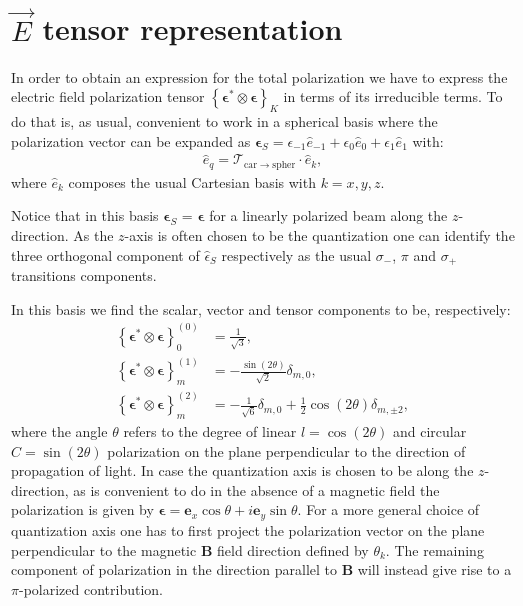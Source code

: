 \section{$\vec{E}$ tensor representation}
\label{app:E_field_tens}
In order to obtain an expression for the total polarization we have to express the electric field polarization tensor $\left\{\boldsymbol{\epsilon}^* \otimes \boldsymbol{\epsilon}\right\}_K$ in terms of its irreducible terms. To do that is, as usual, convenient to work in a spherical basis where the polarization vector can be expanded as $\boldsymbol{\epsilon}_{S} = \epsilon_{-1} \hat{e}_{-1} + \epsilon_{0}\hat{e}_{0} + \epsilon_{1} \hat{e}_{1}$ with:
\begin{align}
	\hat{e}_{q} = \mathcal{T}_{\mathrm{car\rightarrow spher}}\cdot \hat{e}_{k},
\end{align}
where $\hat{e}_{k}$ composes the usual Cartesian basis with $k = x,y,z$.

Notice that in this basis $\boldsymbol{\epsilon}_S$ = $\boldsymbol{\epsilon}$ for a linearly polarized beam along the $z$-direction. As the $z$-axis is often chosen to be the quantization one can identify the three orthogonal component of $\hat{\epsilon}_S$ respectively as the usual $\sigma_-$, $\pi$ and $\sigma_+$  transitions components.

In this basis we find the scalar, vector and tensor components to be, respectively:
\begin{align}
\left\{\boldsymbol{\epsilon}^* \otimes \boldsymbol{\epsilon}\right\}^{\left(0\right)}_0 &= \frac{1}{\sqrt{3}},\nonumber\\
\left\{\boldsymbol{\epsilon}^* \otimes \boldsymbol{\epsilon}\right\}^{\left(1\right)}_m &=-\frac{\sin\left(2\theta\right)}{\sqrt2}\delta_{m,0},\nonumber\\
\left\{\boldsymbol{\epsilon}^* \otimes \boldsymbol{\epsilon}\right\}^{\left(2\right)}_m &= -\frac{1}{\sqrt{6}}\delta_{m,0}+\frac{1}{2}\cos\left(2\theta\right)\delta_{m,\pm2}, 
\end{align}
where the angle $\theta$ refers to the degree of linear $l = \cos\left(2\theta\right)$ and circular $C=\sin\left(2\theta\right)$ polarization on the plane perpendicular to the direction of propagation of light. In case the quantization axis is chosen to be along the $z$-direction, as is convenient to do in the absence of a magnetic field the polarization is given by $\boldsymbol{\epsilon} = \mathbf{e}_x\cos\theta + i\mathbf{e}_y\sin\theta$. For a more general choice of quantization axis one has to first project the polarization vector on the plane perpendicular to the magnetic $\mathbf{B}$ field direction defined by $\theta_k$. The remaining component of polarization in the direction parallel to $\mathbf{B}$ will instead give rise to a $\pi$-polarized contribution.

